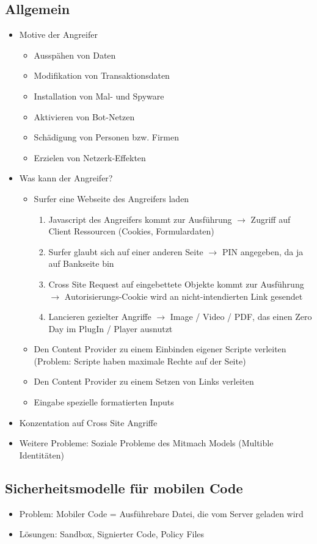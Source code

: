 \documentclass{article} %
\begin{document}
	\subsection{Allgemein}
	\begin{itemize}
		\item Motive der Angreifer
		\begin{itemize}
			\item Ausspähen von Daten
			\item Modifikation von Transaktionsdaten
			\item Installation von Mal- und Spyware
			\item Aktivieren von Bot-Netzen
			\item Schädigung von Personen bzw. Firmen
			\item Erzielen von Netzerk-Effekten
		\end{itemize}
		\item Was kann der Angreifer?
		\begin{itemize}
			\item Surfer eine Webseite des Angreifers laden
			\begin{enumerate}
				\item Javascript des Angreifers kommt zur Ausführung $\rightarrow$ Zugriff auf Client Ressourcen (Cookies, Formulardaten)
				\item Surfer glaubt sich auf einer anderen Seite $\rightarrow$ PIN angegeben, da ja auf Bankseite bin
				\item Cross Site Request auf eingebettete Objekte kommt zur Ausführung $\rightarrow$ Autorisierungs-Cookie wird an nicht-intendierten Link gesendet
				\item Lancieren gezielter Angriffe $\rightarrow$ Image / Video / PDF, das einen Zero Day im PlugIn / Player ausnutzt
			\end{enumerate}
			\item Den Content Provider zu einem Einbinden eigener Scripte verleiten (Problem: Scripte haben maximale Rechte auf der Seite)
			\item Den Content Provider zu einem Setzen von Links verleiten 
			\item Eingabe spezielle formatierten Inputs 
		\end{itemize}
		\item Konzentation auf Cross Site Angriffe
		\item Weitere Probleme: Soziale Probleme des Mitmach Models (Multible Identitäten)
	\end{itemize}
	\subsection{Sicherheitsmodelle für mobilen Code}
	\begin{itemize}
		\item Problem: Mobiler Code = Ausführebare Datei, die vom Server geladen wird
		\item Lösungen: Sandbox, Signierter Code, Policy Files
	\end{itemize}
\end{document}
